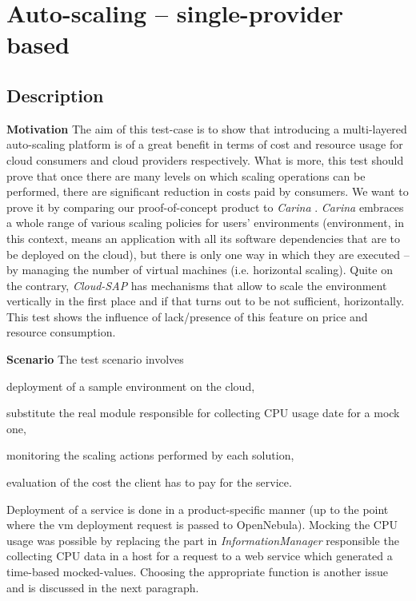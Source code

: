 \section{Auto-scaling -- single-provider based}
\subsection*{Description}
\begin{asparaenum}
\item[\textbf{Motivation}]The aim of this test-case is to show that introducing a multi-layered auto-scaling platform is of a great benefit in terms of cost and resource usage for cloud consumers and cloud providers respectively. What is more, this test should prove that once there are many levels on which scaling operations can be performed, there are significant reduction in costs paid by consumers.
We want to prove it by comparing our proof-of-concept product to \emph{Carina} \cite{Carina}. \emph{Carina} embraces a whole range of various scaling policies for users' environments (environment, in this context, means an application with all its software dependencies that are to be deployed on the cloud), but there is only one way in which they are executed -- by managing the number of virtual machines (i.e. horizontal scaling). Quite on the contrary, \emph{Cloud-SAP} has mechanisms that allow to scale the environment vertically in the first place and if that turns out to be not sufficient, horizontally. This test shows the influence of lack/presence of this feature on price and resource consumption.
\item[\textbf{Scenario}] The test scenario involves
  \begin{inparaenum}[a)]
    \item deployment of a sample environment on the cloud,
    \item substitute the real module responsible for collecting CPU usage date for a mock one,
    \item monitoring the scaling actions performed by each solution,
    \item evaluation of the cost the client has to pay for the service.
  \end{inparaenum}
  Deployment of a service is done in a product-specific manner (up to the point where the vm deployment request is passed to OpenNebula). Mocking the CPU usage was possible by replacing the part in \emph{InformationManager} responsible the collecting CPU data in a host for a request to a web service which generated a time-based mocked-values. Choosing the appropriate function is another issue and is discussed in the next paragraph.
\end{asparaenum}


